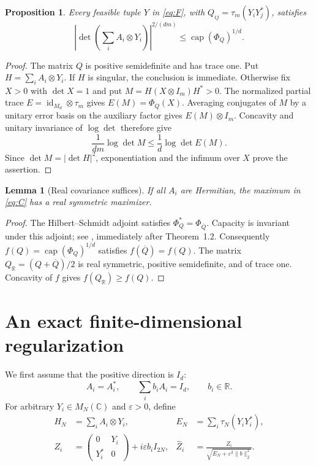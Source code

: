 \documentclass[11pt]{article}
\newtheorem{lemma}[theorem]{Lemma}
\newtheorem{proposition}[theorem]{Proposition}
\newcommand{\C}{\mathbb C}
\newcommand{\R}{\mathbb R}
\newcommand{\capop}{\operatorname{cap}}
\newcommand{\id}{\operatorname{id}}
\begin{document}
\begin{proposition}\label{prop:upper}
Every feasible tuple $Y$ in \eqref{eq:F}, with
$Q_{ij}=\tau_m(Y_iY_j^*)$, satisfies
\[
 \left|\det\left(\sum_i A_i\otimes Y_i\right)\right|^{2/(dm)}
 \le \capop(\Phi_Q)^{1/d}.
\]
\end{proposition}
\begin{proof}
The matrix $Q$ is positive semidefinite and has trace one. Put $H=\sum_iA_i\otimes Y_i$. If $H$ is singular, the conclusion is immediate. Otherwise fix $X>0$ with $\det X=1$ and put $M=H(X\otimes I_m)H^*>0$. The normalized partial trace $E=\id_{M_d}\otimes\tau_m$ gives $E(M)=\Phi_Q(X)$. Averaging conjugates of $M$ by a unitary error basis on the auxiliary factor gives $E(M)\otimes I_m$. Concavity and unitary invariance of $\log\det$ therefore give
\[
 \frac{1}{dm}\log\det M\le\frac1d\log\det E(M).
\]
Since $\det M=|\det H|^2$, exponentiation and the infimum over $X$ prove the assertion.
\end{proof}

\begin{lemma}[Real covariance suffices]\label{lem:real}
If all $A_i$ are Hermitian, the maximum in \eqref{eq:C} has a real symmetric maximizer.
\end{lemma}
\begin{proof}
The Hilbert--Schmidt adjoint satisfies $\Phi_Q^*=\Phi_{\overline Q}$. Capacity is invariant under this adjoint; see \cite{ms}, immediately after Theorem~1.2. Consequently $f(Q)=\capop(\Phi_Q)^{1/d}$ satisfies $f(\overline Q)=f(Q)$. The matrix $Q_{\R}=(Q+\overline Q)/2$ is real symmetric, positive semidefinite, and of trace one. Concavity of $f$ gives $f(Q_{\R})\ge f(Q)$.
\end{proof}

\section{An exact finite-dimensional regularization}
We first assume that the positive direction is $I_d$:
\begin{equation}\label{eq:identity}
 A_i=A_i^*,\qquad \sum_i b_iA_i=I_d,\qquad b_i\in\R .
\end{equation}
For arbitrary $Y_i\in M_N(\C)$ and $\varepsilon>0$, define
\begin{align}
 H_N&=\sum_i A_i\otimes Y_i,&
 E_N&=\sum_i\tau_N(Y_iY_i^*),\\
 Z_i&=
 \begin{pmatrix}0&Y_i\\Y_i^*&0\end{pmatrix}
 +i\varepsilon b_iI_{2N},&
 \widehat Z_i&=\frac{Z_i}{\sqrt{E_N+\varepsilon^2\|b\|_2^2}}.\label{eq:Z}
\end{align}
\end{document}
